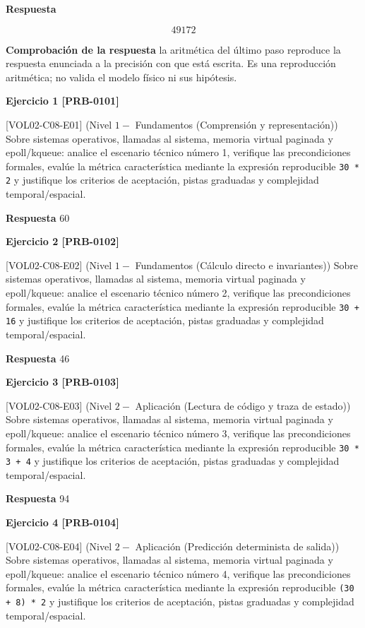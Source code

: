 \documentclass{book}
\begin{document}
\noindent\textbf{Respuesta}

\[
49172
\]

\noindent\textbf{Comprobación de la respuesta} la aritmética del último paso reproduce la respuesta enunciada a la precisión con que está escrita. Es una reproducción aritmética; no valida el modelo físico ni sus hipótesis.

\noindent\textbf{Ejercicio 1 [PRB-0101]}

[VOL02-C08-E01] (Nivel \(1 -\) Fundamentos (Comprensión y representación)) Sobre sistemas operativos, llamadas al sistema, memoria virtual paginada y epoll/kqueue: analice el escenario técnico número 1, verifique las precondiciones formales, evalúe la métrica característica mediante la expresión reproducible \texttt{30 * 2} y justifique los criterios de aceptación, pistas graduadas y complejidad temporal/espacial.

\noindent\textbf{Respuesta} 60

\noindent\textbf{Ejercicio 2 [PRB-0102]}

[VOL02-C08-E02] (Nivel \(1 -\) Fundamentos (Cálculo directo e invariantes)) Sobre sistemas operativos, llamadas al sistema, memoria virtual paginada y epoll/kqueue: analice el escenario técnico número 2, verifique las precondiciones formales, evalúe la métrica característica mediante la expresión reproducible \texttt{30 + 16} y justifique los criterios de aceptación, pistas graduadas y complejidad temporal/espacial.

\noindent\textbf{Respuesta} 46

\noindent\textbf{Ejercicio 3 [PRB-0103]}

[VOL02-C08-E03] (Nivel \(2 -\) Aplicación (Lectura de código y traza de estado)) Sobre sistemas operativos, llamadas al sistema, memoria virtual paginada y epoll/kqueue: analice el escenario técnico número 3, verifique las precondiciones formales, evalúe la métrica característica mediante la expresión reproducible \texttt{30 * 3 + 4} y justifique los criterios de aceptación, pistas graduadas y complejidad temporal/espacial.

\noindent\textbf{Respuesta} 94

\noindent\textbf{Ejercicio 4 [PRB-0104]}

[VOL02-C08-E04] (Nivel \(2 -\) Aplicación (Predicción determinista de salida)) Sobre sistemas operativos, llamadas al sistema, memoria virtual paginada y epoll/kqueue: analice el escenario técnico número 4, verifique las precondiciones formales, evalúe la métrica característica mediante la expresión reproducible \texttt{(30 + 8) * 2} y justifique los criterios de aceptación, pistas graduadas y complejidad temporal/espacial.
\end{document}
